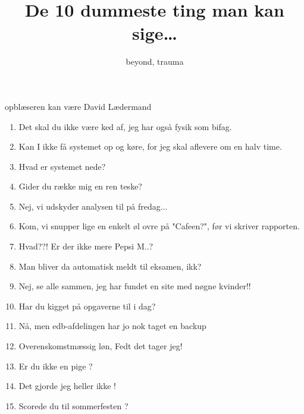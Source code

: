 \documentclass[danish]{article}
\title{De 10 dummeste ting man kan sige\ldots}
\author{beyond, trauma}
\begin{document}
\maketitle

\begin{sketch}
\begin{roles}
   opblæseren kan være David Lædermand
\end{roles}


\begin{enumerate}
\item Det skal du ikke være ked af, jeg har også fysik som bifag.
\item Kan I ikke få systemet op og køre, for jeg skal aflevere om en halv time.
\item Hvad er systemet nede?
\item Gider du række mig en ren teske?
\item Nej, vi udskyder analysen til på fredag...
\item Kom, vi snupper lige en enkelt øl ovre på "Cafeen?", før vi skriver rapporten.
\item Hvad??! Er der ikke mere Pepsi M..?
\item Man bliver da automatisk meldt til eksamen, ikk?
\item Nej, se alle sammen, jeg har fundet en site med nøgne kvinder!!
\item Har du kigget på opgaverne til i dag?
\item Nå, men edb-afdelingen har jo nok taget en backup
\item Overenskomstmæssig løn, Fedt det tager jeg!
\item Er du ikke en pige ?
\item Det gjorde jeg heller ikke !
\item Scorede du til sommerfesten ?
\end{enumerate}

\end{sketch}
\end{document}

